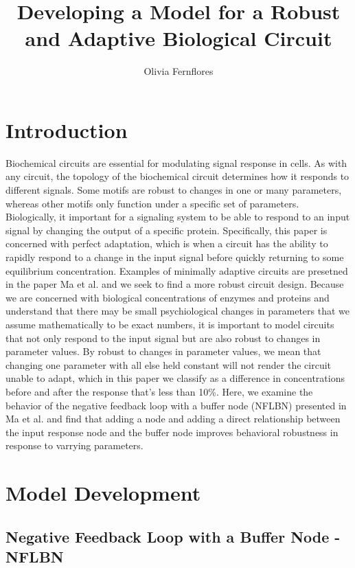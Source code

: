 \documentclass{article}
\title{Developing a Model for a Robust and Adaptive Biological Circuit}
\author{Olivia Fernflores}
\begin{document}
\maketitle

\section{Introduction}
Biochemical circuits are essential for modulating signal response in cells. As with any circuit, the topology of the biochemical circuit determines how it responds to different signals. Some motifs are robust to changes in one or many parameters, whereas other motifs only function under a specific set of parameters. Biologically, it important for a signaling system to be able to respond to an input signal by changing the output of a specific protein. Specifically, this paper is concerned with perfect adaptation, which is when a circuit has the ability to rapidly respond to a change in the input signal before quickly returning to some equilibrium concentration. Examples of minimally adaptive circuits are presetned in the paper Ma et al. \cite{challenge2paperD2L} and we seek to find a more robust circuit design. Because we are concerned with biological concentrations of enzymes and proteins and understand that there may be small psychiological changes in parameters that we assume mathematically to be exact numbers, it is important to model circuits that not only respond to the input signal but are also robust to changes in parameter values. By robust to changes in parameter values, we mean that changing one parameter with all else held constant will not render the circuit unable to adapt, which in this paper we classify as a difference in concentrations before and after the response that's less than 10\%. Here, we examine the behavior of the negative feedback loop with a buffer node (NFLBN) presented in Ma et al. \cite{challenge2paperD2L} and find that adding a node and adding a direct relationship between the input response node and the buffer node improves behavioral robustness in response to varrying parameters. 

\section{Model Development}

\subsection{Negative Feedback Loop with a Buffer Node - NFLBN}
\end{document}
